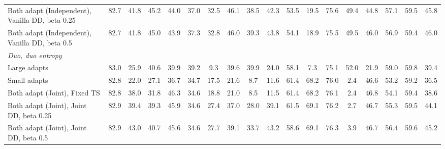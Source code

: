\begin{table}[t]
{\begin{tabular}{l|c|ccc|cccc|cccc|cccc|c}
        \quad Both adapt (Independent), Vanilla DD, beta 0.25 & 82.7 & 41.8 & 45.2 & 44.0 & 37.0 & 32.5 & 46.1 & 38.5 & 42.3 & 53.5 & 19.5 & 75.6 & 49.4 & 44.8 & 57.1 & 59.5 & 45.8 \\
        \quad Both adapt (Independent), Vanilla DD, beta 0.5 & 82.7 & 41.8 & 45.0 & 43.9 & 37.3 & 32.8 & 46.0 & 39.3 & 43.8 & 54.1 & 18.9 & 75.5 & 49.5 & 46.0 & 56.9 & 59.4 & 46.0 \\
        \midrule
        \multicolumn{18}{l}{\textit{Duo, duo entropy}} \\
        \quad Large adapts & 83.0 & 25.9 & 40.6 & 39.9 & 39.2 & 9.3 & 39.6 & 39.9 & 24.0 & 58.1 & 7.3 & 75.1 & 52.0 & 21.9 & 59.0 & 59.8 & 39.4 \\
        \quad Small adapts & 82.8 & 22.0 & 27.1 & 36.7 & 34.7 & 17.5 & 21.6 & 8.7 & 11.6 & 61.4 & 68.2 & 76.0 & 2.4 & 46.6 & 53.2 & 59.2 & 36.5 \\
        \quad Both adapt (Joint), Fixed TS & 82.8 & 38.0 & 31.8 & 46.3 & 34.6 & 18.8 & 21.0 & 8.5 & 11.5 & 61.4 & 68.2 & 76.1 & 2.4 & 46.8 & 54.1 & 59.4 & 38.6 \\
        \quad Both adapt (Joint), Joint DD, beta 0.25 & 82.9 & 39.4 & 39.3 & 45.9 & 34.6 & 27.4 & 37.0 & 28.0 & 39.1 & 61.5 & 69.1 & 76.2 & 2.7 & 46.7 & 55.3 & 59.5 & 44.1 \\
        \quad Both adapt (Joint), Joint DD, beta 0.5 & 82.9 & 43.0 & 40.7 & 45.6 & 34.6 & 27.7 & 39.1 & 33.7 & 43.2 & 58.6 & 69.1 & 76.3 & 3.9 & 46.7 & 56.4 & 59.6 & 45.2 \\
        \bottomrule
    \end{tabular}%
    }
\end{table}
